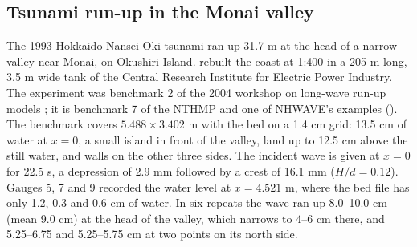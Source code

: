 \subsection{Tsunami run-up in the Monai valley}
\label{sec:wd-monai}

The 1993 Hokkaido Nansei-Oki tsunami ran up 31.7 m at the head of a narrow
valley near Monai, on Okushiri Island. \citet{matsuyama2001} rebuilt the
coast at 1:400 in a 205 m long, 3.5 m wide tank of the Central Research
Institute for Electric Power Industry. The experiment was benchmark 2 of the
2004 workshop on long-wave run-up models \citep{liu2008}; it is benchmark 7
of the NTHMP \citep{synolakis2008} and one of NHWAVE's examples
(). The benchmark
covers $5.488 \times 3.402$ m with the bed on a 1.4 cm grid: 13.5 cm of water
at $x = 0$, a small island in front of the valley, land up to 12.5 cm above
the still water, and walls on the other three sides. The incident wave is
given at $x = 0$ for 22.5 s, a depression of 2.9 mm followed by a crest of
16.1 mm ($H/d = 0.12$). Gauges 5, 7 and 9 recorded the water level at
$x = 4.521$ m, where the bed file has only 1.2, 0.3 and 0.6 cm of water. In
six repeats the wave ran up 8.0--10.0 cm (mean 9.0 cm) at the head of the
valley, which narrows to 4--6 cm there, and 5.25--6.75 and 5.25--5.75 cm at
two points on its north side.

